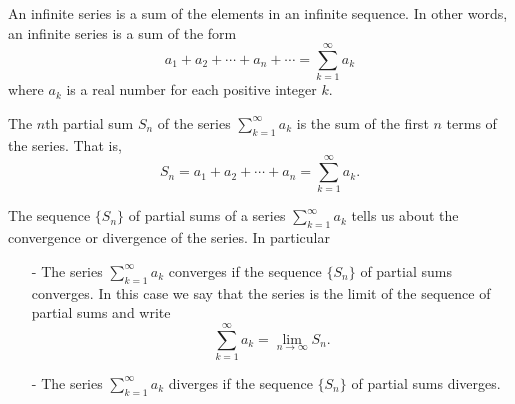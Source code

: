 








\begin{summary}
\item An infinite series is a sum of the elements in an infinite sequence. In other words, an infinite series is a sum of the form
\[a_1 + a_2 + \cdots + a_n + \cdots = \sum_{k=1}^{\infty} a_k\]
where $a_k$ is a real number for each positive integer $k$.
\item The $n$th partial sum $S_n$ of the series $\sum_{k=1}^{\infty} a_k$ is the sum of the first $n$ terms of the series. That is,
\[S_n = a_1+a_2+ \cdots + a_n = \sum_{k=1}^{\infty} a_k.\]
\item The sequence $\{S_n\}$ of partial sums of a series $\sum_{k=1}^{\infty} a_k$ tells us about the convergence or divergence of the series.  In particular
	\begin{itemize}
	\item[-] The series $\sum_{k=1}^{\infty} a_k$ converges if the sequence $\{S_n\}$ of partial sums converges. In this case we say that the series is the limit of the sequence of partial sums and write
	\[\sum_{k=1}^{\infty} a_k =\lim_{n \to \infty} S_n.\]
	\item[-] The series $\sum_{k=1}^{\infty} a_k$ diverges if the sequence $\{S_n\}$ of partial sums diverges.
	\end{itemize}
\end{summary}

\nin \hrulefill



\clearpage
